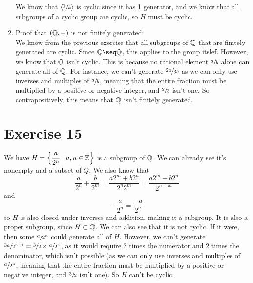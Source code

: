 \documentclass[12pt]{article}
\begin{document}
\begin{enumerate}[label=\textbf{\alph*.}]
            We know that $\langle \sfrac{1}{k} \rangle$ is cyclic
            since it has 1 generator,
            and we know that all subgroups of a cyclic group are cyclic,
            so $H$ must be cyclic. 
        \item
            Proof that $(\mathbb{Q}, +)$ is not finitely generated: \\
            We know from the previous exercise that all subgroups
            of $\mathbb{Q}$ that are finitely generated are cyclic.
            Since $\qbb \seq \qbb$, this applies to the group itslef.
            However, we know that $\mathbb{Q}$ isn't cyclic.
            This is because no rational element $\sfrac{a}{b}$
            alone can generate all of $\mathbb{Q}$.
            For instance,
            we can't generate $\sfrac{2a}{3b}$
            as we can only use inverses and multiples of $\sfrac{a}{b}$,
            meaning that the entire fraction must be multiplied
            by a positive or negative integer,
            and $\sfrac{2}{3}$ isn't one.
            So contrapositively,
            this means that $\mathbb{Q}$ isn't finitely generated.
    \end{enumerate}


    \section*{Exercise 15}
    We have $H = \left\{ \dfrac{a}{2^n} \mid a, n \in \mathbb{Z} \right\}$
    is a subgroup of $\mathbb{Q}$.
    We can already see it's nonempty and a subset of $Q$.
    We also know that
    \[ \dfrac{a}{2^n} + \dfrac{b}{2^m} = \dfrac{a2^m + b2^n}{2^n2^m}
    = \dfrac{a2^m + b2^n}{2^{n + m}} \]
    and
    \[ -\dfrac{a}{2^n} = \dfrac{-a}{2^n} \]
    so $H$ is also closed under inverses and addition,
    making it a subgroup.
    It is also a proper subgroup, since $H \subset \mathbb{Q}$.
    We can also see that it is not cyclic.
    If it were, then some $\sfrac{a}{2^n}$ could generate all of $H$.
    However, we can't generate
    $\sfrac{3a}{2^{n+1}} = \sfrac{3}{2} \times \sfrac{a}{2^n}$,
    as it would require 3 times the numerator
    and 2 times the denominator,
    which isn't possible
    (as we can only use inverses and multiples of $\sfrac{a}{2^n}$,
    meaning that the entire fraction must be multiplied
    by a positive or negative integer,
    and $\sfrac{3}{2}$ isn't one).
    So $H$ can't be cyclic.
\end{document}
